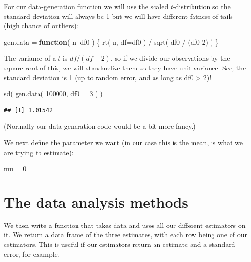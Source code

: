 \documentclass[
]{book}
\newenvironment{Shaded}{\begin{snugshade}}{\end{snugshade}}
\newcommand{\AttributeTok}[1]{\textcolor[rgb]{0.77,0.63,0.00}{#1}}
\newcommand{\ControlFlowTok}[1]{\textcolor[rgb]{0.13,0.29,0.53}{\textbf{#1}}}
\newcommand{\DecValTok}[1]{\textcolor[rgb]{0.00,0.00,0.81}{#1}}
\newcommand{\FunctionTok}[1]{\textcolor[rgb]{0.00,0.00,0.00}{#1}}
\newcommand{\NormalTok}[1]{#1}
\newcommand{\OtherTok}[1]{\textcolor[rgb]{0.56,0.35,0.01}{#1}}
\newcommand{\SpecialCharTok}[1]{\textcolor[rgb]{0.00,0.00,0.00}{#1}}
\begin{document}
For our data-generation function we will use the scaled \(t\)-distribution so
the standard deviation will always be 1 but we will have different fatness of
tails (high chance of outliers):

\begin{Shaded}
\begin{Highlighting}[]
\NormalTok{gen.data }\OtherTok{=} \ControlFlowTok{function}\NormalTok{( n, df0 ) \{}
    \FunctionTok{rt}\NormalTok{( n, }\AttributeTok{df=}\NormalTok{df0 ) }\SpecialCharTok{/} \FunctionTok{sqrt}\NormalTok{( df0 }\SpecialCharTok{/}\NormalTok{ (df0}\DecValTok{{-}2}\NormalTok{) )}
\NormalTok{\}}
\end{Highlighting}
\end{Shaded}

The variance of a \(t\) is \(df/(df-2)\), so if we divide our observations by the
square root of this, we will standardize them so they have unit variance.
See, the standard deviation is 1 (up to random error, and as long as df0 \textgreater{}
2)!:

\begin{Shaded}
\begin{Highlighting}[]
\FunctionTok{sd}\NormalTok{( }\FunctionTok{gen.data}\NormalTok{( }\DecValTok{100000}\NormalTok{, }\AttributeTok{df0 =} \DecValTok{3}\NormalTok{ ) )}
\end{Highlighting}
\end{Shaded}

\begin{verbatim}
## [1] 1.01542
\end{verbatim}

(Normally our data generation code would be a bit more fancy.)

We next define the parameter we want (in our case this is the mean, is what
we are trying to estimate):

\begin{Shaded}
\begin{Highlighting}[]
\NormalTok{mu }\OtherTok{=} \DecValTok{0}
\end{Highlighting}
\end{Shaded}

\hypertarget{the-data-analysis-methods}{%
\section{The data analysis methods}\label{the-data-analysis-methods}}

We then write a function that takes data and uses all our different
estimators on it. We return a data frame of the three estimates, with each
row being one of our estimators. This is useful if our estimators return an
estimate and a standard error, for example.
\end{document}
